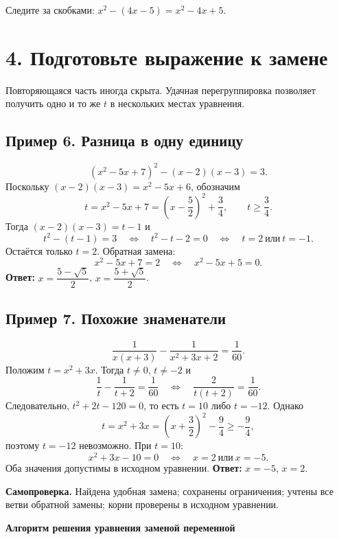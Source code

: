 \documentclass[a4paper,12pt]{article}
\newcommand{\key}[1]{{\color{darkaccent}\textbf{#1}}}
\newcommand{\note}[1]{{\small\color{quiet}#1}}
\newcommand{\headsec}[1]{\section*{\color{darkaccent}#1}\vspace{-5pt}{\color{hairline}\rule{\linewidth}{0.55pt}}\par\vspace{1pt}}
\newcommand{\headsub}[1]{\subsection*{\color{accent}#1}}
\begin{document}
\note{Следите за скобками: \(x^2-(4x-5)=x^2-4x+5\).}

\clearpage
\headsec{4. Подготовьте выражение к замене}
Повторяющаяся часть иногда скрыта. Удачная перегруппировка позволяет получить одно и то же \(t\)
в нескольких местах уравнения.

\headsub{Пример 6. Разница в одну единицу}
\[
 (x^2-5x+7)^2-(x-2)(x-3)=3.
\]
Поскольку \((x-2)(x-3)=x^2-5x+6\), обозначим
\[
 t=x^2-5x+7=\left(x-\frac52\right)^2+\frac34,\qquad t\ge\frac34.
\]
Тогда \((x-2)(x-3)=t-1\) и
\[
 t^2-(t-1)=3\quad\Longleftrightarrow\quad
 t^2-t-2=0\quad\Longleftrightarrow\quad t=2\ \text{или}\ t=-1.
\]
Остаётся только \(t=2\). Обратная замена:
\[
 x^2-5x+7=2\quad\Longleftrightarrow\quad x^2-5x+5=0.
\]
\key{Ответ:} \(x=\dfrac{5-\sqrt5}{2}\), \(x=\dfrac{5+\sqrt5}{2}\).

\headsub{Пример 7. Похожие знаменатели}
\[
 \frac1{x(x+3)}-\frac1{x^2+3x+2}=\frac1{60}.
\]
Положим \(t=x^2+3x\). Тогда \(t\ne0\), \(t\ne-2\) и
\[
 \frac1t-\frac1{t+2}=\frac1{60}
 \quad\Longleftrightarrow\quad
 \frac2{t(t+2)}=\frac1{60}.
\]
Следовательно, \(t^2+2t-120=0\), то есть \(t=10\) либо \(t=-12\).
Однако
\[
 t=x^2+3x=\left(x+\frac32\right)^2-\frac94\ge-\frac94,
\]
поэтому \(t=-12\) невозможно. При \(t=10\):
\[
 x^2+3x-10=0\quad\Longleftrightarrow\quad x=2\ \text{или}\ x=-5.
\]
Оба значения допустимы в исходном уравнении. \key{Ответ:} \(x=-5\), \(x=2\).

\vspace{1mm}
\noindent\textbf{\color{darkaccent}Самопроверка.} Найдена удобная замена; сохранены ограничения;
учтены все ветви обратной замены; корни проверены в исходном уравнении.

\clearpage
\thispagestyle{plain}
\vspace*{9mm}
\begin{center}
{\Large\bfseries\color{darkaccent}Алгоритм решения уравнения заменой переменной}\par
\vspace{15mm}
\end{center}
\clearpage
\end{document}
